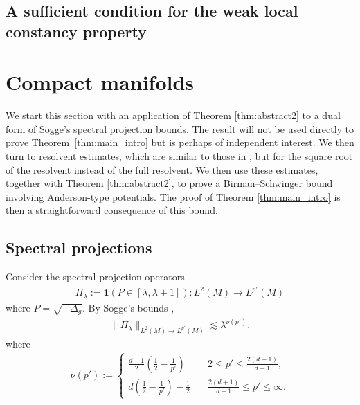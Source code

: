 \documentclass[12pt,reqno]{amsart}
\theoremstyle{definition}
\theoremstyle{remark}
\numberwithin{equation}{section}
\newcommand{\1}{\mathbbm{1}}
\begin{document}
\subsection{A sufficient condition for the weak local constancy property}



\section{Compact manifolds}
We start this section with an application of Theorem \ref{thm:abstract2} to a dual form of Sogge's spectral projection bounds. The result will not be used directly to prove Theorem~\ref{thm:main_intro} but is perhaps of independent interest. We then turn to resolvent estimates, which are similar to those in \cite{Cuenin2026}, but for the square root of the resolvent instead of the full resolvent. We then use these estimates, together with Theorem \ref{thm:abstract2}, to prove a Birman--Schwinger bound involving Anderson-type potentials. The proof of Theorem \ref{thm:main_intro} is then a straightforward consequence of this bound.

\subsection{Spectral projections}
Consider the spectral projection operators
\begin{align}
  \Pi_{\lambda} 
  := \mathbf{1}\left(P \in [\lambda,\lambda+1]\right):L^2(M)\to L^{p'}(M)
\end{align}
where $P=\sqrt{-\Delta_g}$. By Sogge's bounds \cite{Sogge1988},
\begin{align}\label{eq: Sogge bound large p'}
  \|\Pi_{\lambda} \|_{L^2(M)\to  L^{p'}(M)}\lesssim \lambda^{\nu(p')}. 
\end{align}
where
\begin{align}\label{def. nu(p')}
  \nu(p') :=
  \begin{cases}
    \frac{d-1}{2}(\frac{1}{2}-\frac{1}{p'})\quad & 2\leq p'\leq \frac{2(d+1)}{d-1},\\
    d(\frac{1}{2}-\frac{1}{p'})-\frac{1}{2}\quad & \frac{2(d+1)}{d-1}\leq  p'\leq \infty.
  \end{cases}   
\end{align}
\end{document}

